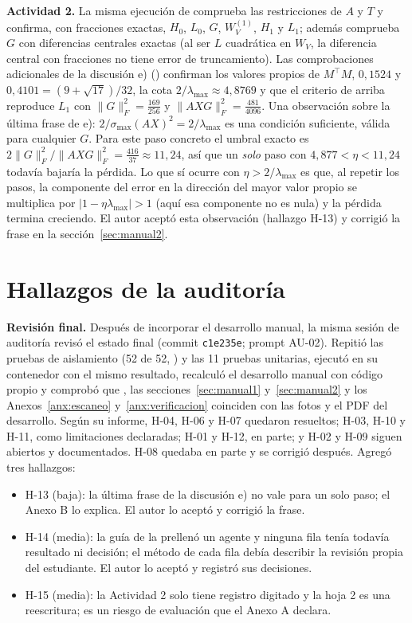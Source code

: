 \documentclass[10pt]{article}
\begin{document}
\textbf{Actividad 2.} La misma
ejecución de  comprueba las restricciones de $A$ y $T$ y confirma,
con fracciones exactas, $H_0$, $L_0$, $G$, $W_V^{(1)}$, $H_1$ y $L_1$; además comprueba $G$ con
diferencias centrales exactas (al ser $L$ cuadrática en $W_V$, la diferencia central con fracciones no
tiene error de truncamiento). Las comprobaciones adicionales de la discusión e)
() confirman los valores propios de
$M^\top M$, $0{,}1524$ y $0{,}4101 = (9+\sqrt{17})/32$, la cota $2/\lambda_{\max}\approx4{,}8769$ y que el
criterio de arriba reproduce $L_1$ con $\|G\|_F^2 = \tfrac{169}{256}$ y $\|AXG\|_F^2 = \tfrac{481}{4096}$.
Una observación sobre la última frase de e): $2/\sigma_{\max}(AX)^2 = 2/\lambda_{\max}$ es una
condición suficiente, válida para cualquier $G$. Para este paso concreto el umbral exacto es
$2\|G\|_F^2/\|AXG\|_F^2 = \tfrac{416}{37}\approx11{,}24$, así que un \emph{solo} paso con
$4{,}877<\eta<11{,}24$ todavía bajaría la pérdida. Lo que sí ocurre con $\eta>2/\lambda_{\max}$ es que,
al repetir los pasos, la componente del error en la dirección del mayor valor propio se multiplica por
$|1-\eta\lambda_{\max}|>1$ (aquí esa componente no es nula) y la pérdida termina creciendo. El autor
aceptó esta observación (hallazgo H-13) y corrigió la frase en la sección~\ref{sec:manual2}.

\section{Hallazgos de la auditoría}\label{anx:auditoria}
\textbf{Revisión final.} Después de incorporar el desarrollo manual, la misma sesión de auditoría
revisó el estado final (commit \texttt{c1e235e}; prompt AU-02). Repitió las pruebas de aislamiento
(52 de 52, ) y las 11 pruebas unitarias, ejecutó
 en su contenedor con el mismo resultado, recalculó el desarrollo manual con
código propio y comprobó que , las secciones~\ref{sec:manual1}
y~\ref{sec:manual2} y los Anexos~\ref{anx:escaneo} y~\ref{anx:verificacion} coinciden con las fotos y
el PDF del desarrollo. Según su informe, H-04, H-06 y H-07 quedaron resueltos; H-03, H-10 y H-11,
como limitaciones declaradas; H-01 y H-12, en parte; y H-02 y H-09 siguen abiertos y documentados.
H-08 quedaba en parte y se corrigió después. Agregó tres hallazgos:
\begin{itemize}[nosep]
  \item H-13 (baja): la última frase de la discusión e) no vale para un solo paso; el Anexo B lo
        explica. El autor lo aceptó y corrigió la frase.
  \item H-14 (media): la guía de  la prellenó un agente y ninguna fila
        tenía todavía resultado ni decisión; el método de cada fila debía describir la revisión
        propia del estudiante. El autor lo aceptó y registró sus decisiones.
  \item H-15 (media): la Actividad 2 solo tiene registro digitado y la hoja 2 es una reescritura;
        es un riesgo de evaluación que el Anexo A declara.
\end{itemize}
\end{document}
